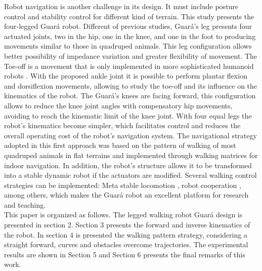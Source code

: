 Robot navigation is another challenge in its design. It must include posture control \cite{chen2018} and stability control \cite{rebula2007} for different kind of terrain. 
This study presents the four-legged Guar\'a robot. Different of previous studies, Guar\'a's leg presents four actuated joints, two in the hip, one in the knee, and one in the foot to producing movements similar to those in quadruped animals. This leg configuration allows better possibility of impedance variation and greater flexibility of movement. The Toe-off is a movement that is only implemented in more sophisticated humanoid robots \cite{griffin2017}. With the proposed ankle joint it is possible to perform plantar flexion and dorsiflexion movements, allowing to study the toe-off and its influence on the kinematics of the robot. The Guar\'a's knees are facing forward, this configuration allows to reduce the knee joint angles with compensatory hip movements, avoiding to reach the kinematic limit of the knee joint. With four equal legs the robot's kinematics become simpler, which facilitates control and reduces the overall operating cost of the robot’s navigation system. The navigational strategy adopted in this first approach was based on the pattern of walking of most quadruped animals in flat terrains \cite{berkemeier1998} and implemented through walking matrices for indoor navigation. In addition, the robot's structure allows it to be transformed into a stable dynamic robot if the actuators are modified. Several walking control strategies can be implemented: Meta stable locomotion \cite{byl2008}, robot cooperation \cite{rocha2011}, among others, which makes the Guar\'a robot an excellent platform for research and teaching.\\
This paper is organized as follows. The legged walking robot Guar\'a design is presented in section 2. Section 3 presents the forward and inverse kinematics of the robot. In section 4 is presented the walking pattern strategy, considering a straight forward, curves and obstacles overcome trajectories. The experimental results are shown in Section 5 and Section 6 presents the final remarks of this work.


